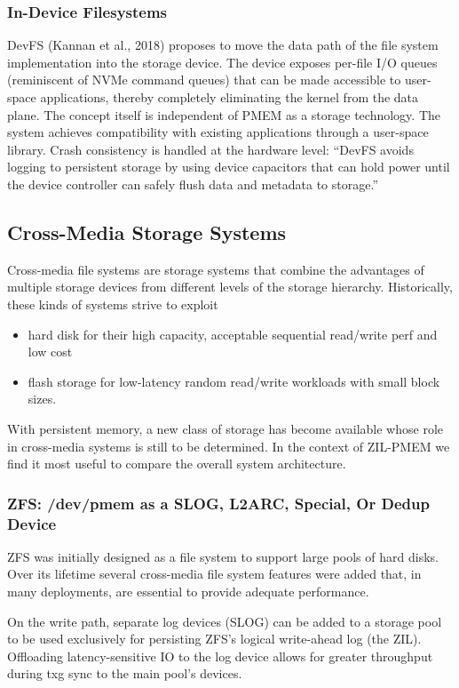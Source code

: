\documentclass[12pt,a4paper,twoside,draft]{book}
\begin{document}
\subsubsection{In-Device Filesystems}
DevFS (Kannan et al., 2018) proposes to move the data path of the file system implementation into the storage device. The device exposes per-file I/O queues (reminiscent of NVMe command queues) that can be made accessible to user-space applications, thereby completely eliminating the kernel from the data plane. The concept itself is independent of PMEM as a storage technology. The system achieves compatibility with existing applications through a user-space library. Crash consistency is handled at the hardware level: “DevFS avoids logging to persistent storage by using device capacitors that can hold power until the device controller can safely flush data and metadata to storage.”

\subsection{Cross-Media Storage Systems}
Cross-media file systems are storage systems that combine the advantages of multiple storage devices from different levels of the storage hierarchy.
Historically, these kinds of systems strive to exploit
\begin{itemize}
    \item  hard disk for their high capacity, acceptable sequential read/write perf and low cost
    \item flash storage for low-latency random read/write workloads with small block sizes.
\end{itemize}
With persistent memory, a new class of storage has become available whose role in cross-media systems is still to be determined.
In the context of ZIL-PMEM we find it most useful to compare the overall system architecture.

\subsubsection{ ZFS: /dev/pmem as a SLOG, L2ARC, Special, Or Dedup Device}
ZFS was initially designed as a file system to support large pools of hard disks. Over its lifetime several cross-media file system features were added that, in many deployments, are essential to provide adequate performance.

On the write path, separate log devices (SLOG) can be added to a storage pool to be used exclusively for persisting ZFS’s logical write-ahead log (the ZIL). Offloading latency-sensitive IO to the log device allows for greater throughput during txg sync to the main pool’s devices.
\end{document}
